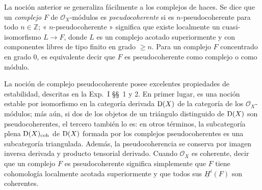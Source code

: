 La noción anterior se generaliza fácilmente a los complejos de haces. Se dice que un \emph{complejo} \(F\) de \(\mathcal O_X\)-módulos es \emph{pseudocoherente} si es \(n\)-pseudocoherente para todo \(n\in\mathbb Z\); « \(n\)-pseudocoherente » significa que existe localmente un cuasi-isomorfismo \(L\to F\), donde \(L\) es un complejo acotado superiormente y con componentes libres de tipo finito en grado \(\geq n\). Para un complejo \(F\) concentrado en grado \(0\), es equivalente decir que \(F\) es pseudocoherente como complejo o como módulo.

La noción de complejo pseudocoherente posee excelentes propiedades de estabilidad, descritas en la Exp.\ I \S\S~1 y 2. En primer lugar, es una noción estable por isomorfismo en la categoría derivada \(\mathrm D(X)\) de la categoría de los \(\mathcal O_X\)-módulos; más aún, si dos de los objetos de un triángulo distinguido de \(\mathrm D(X)\) son pseudocoherentes, el tercero también lo es: en otros términos, la subcategoría plena \(\mathrm D(X)_{\mathrm{coh}}\) de \(\mathrm D(X)\) formada por los complejos pseudocoherentes es una subcategoría triangulada. Además, la pseudocoherencia se conserva por imagen inversa derivada y producto tensorial derivado. Cuando \(\mathcal O_X\) es coherente, decir que un complejo \(F\) es pseudocoherente significa simplemente que \(F\) tiene cohomología localmente acotada superiormente y que todos sus \(\underline H^i(F)\) son coherentes.

